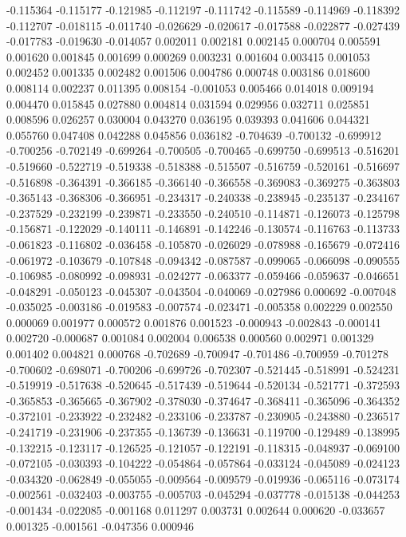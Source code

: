 -0.115364
-0.115177
-0.121985
-0.112197
-0.111742
-0.115589
-0.114969
-0.118392
-0.112707
-0.018115
-0.011740
-0.026629
-0.020617
-0.017588
-0.022877
-0.027439
-0.017783
-0.019630
-0.014057
0.002011
0.002181
0.002145
0.000704
0.005591
0.001620
0.001845
0.001699
0.000269
0.003231
0.001604
0.003415
0.001053
0.002452
0.001335
0.002482
0.001506
0.004786
0.000748
0.003186
0.018600
0.008114
0.002237
0.011395
0.008154
-0.001053
0.005466
0.014018
0.009194
0.004470
0.015845
0.027880
0.004814
0.031594
0.029956
0.032711
0.025851
0.008596
0.026257
0.030004
0.043270
0.036195
0.039393
0.041606
0.044321
0.055760
0.047408
0.042288
0.045856
0.036182
-0.704639
-0.700132
-0.699912
-0.700256
-0.702149
-0.699264
-0.700505
-0.700465
-0.699750
-0.699513
-0.516201
-0.519660
-0.522719
-0.519338
-0.518388
-0.515507
-0.516759
-0.520161
-0.516697
-0.516898
-0.364391
-0.366185
-0.366140
-0.366558
-0.369083
-0.369275
-0.363803
-0.365143
-0.368306
-0.366951
-0.234317
-0.240338
-0.238945
-0.235137
-0.234167
-0.237529
-0.232199
-0.239871
-0.233550
-0.240510
-0.114871
-0.126073
-0.125798
-0.156871
-0.122029
-0.140111
-0.146891
-0.142246
-0.130574
-0.116763
-0.113733
-0.061823
-0.116802
-0.036458
-0.105870
-0.026029
-0.078988
-0.165679
-0.072416
-0.061972
-0.103679
-0.107848
-0.094342
-0.087587
-0.099065
-0.066098
-0.090555
-0.106985
-0.080992
-0.098931
-0.024277
-0.063377
-0.059466
-0.059637
-0.046651
-0.048291
-0.050123
-0.045307
-0.043504
-0.040069
-0.027986
0.000692
-0.007048
-0.035025
-0.003186
-0.019583
-0.007574
-0.023471
-0.005358
0.002229
0.002550
0.000069
0.001977
0.000572
0.001876
0.001523
-0.000943
-0.002843
-0.000141
0.002720
-0.000687
0.001084
0.002004
0.006538
0.000560
0.002971
0.001329
0.001402
0.004821
0.000768
-0.702689
-0.700947
-0.701486
-0.700959
-0.701278
-0.700602
-0.698071
-0.700206
-0.699726
-0.702307
-0.521445
-0.518991
-0.524231
-0.519919
-0.517638
-0.520645
-0.517439
-0.519644
-0.520134
-0.521771
-0.372593
-0.365853
-0.365665
-0.367902
-0.378030
-0.374647
-0.368411
-0.365096
-0.364352
-0.372101
-0.233922
-0.232482
-0.233106
-0.233787
-0.230905
-0.243880
-0.236517
-0.241719
-0.231906
-0.237355
-0.136739
-0.136631
-0.119700
-0.129489
-0.138995
-0.132215
-0.123117
-0.126525
-0.121057
-0.122191
-0.118315
-0.048937
-0.069100
-0.072105
-0.030393
-0.104222
-0.054864
-0.057864
-0.033124
-0.045089
-0.024123
-0.034320
-0.062849
-0.055055
-0.009564
-0.009579
-0.019936
-0.065116
-0.073174
-0.002561
-0.032403
-0.003755
-0.005703
-0.045294
-0.037778
-0.015138
-0.044253
-0.001434
-0.022085
-0.001168
0.011297
0.003731
0.002644
0.000620
-0.033657
0.001325
-0.001561
-0.047356
0.000946
